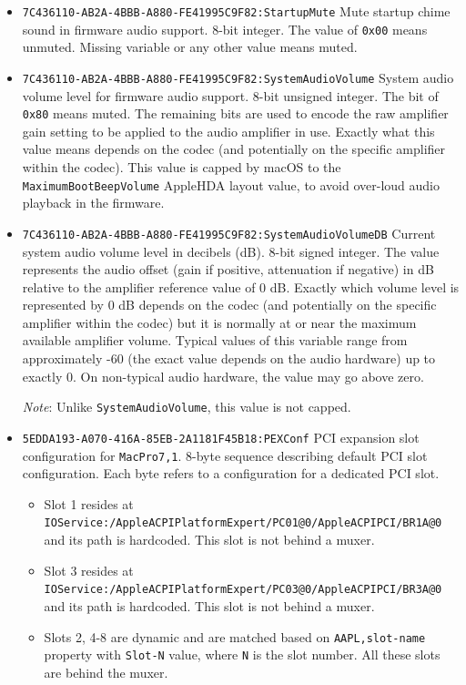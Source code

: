 \documentclass[]{article}
\providecommand{\tightlist}{%
  \setlength{\itemsep}{0pt}\setlength{\parskip}{0pt}}
\begin{document}
\begin{itemize}
  \texttt{7C436110-AB2A-4BBB-A880-FE41995C9F82:run-efi-updater}
  \break
  Override EFI firmware updating support in macOS (MultiUpdater, ThorUtil, and so on).
  Setting this to \texttt{No} or alternative boolean-castable value will prevent
  any firmware updates in macOS starting with 10.10 at least.
\item
  \texttt{7C436110-AB2A-4BBB-A880-FE41995C9F82:StartupMute}
  \break
  Mute startup chime sound in firmware audio support. 8-bit integer.
  The value of \texttt{0x00} means unmuted. Missing variable or any
  other value means muted.
\item
  \texttt{7C436110-AB2A-4BBB-A880-FE41995C9F82:SystemAudioVolume}
  \break
  System audio volume level for firmware audio support. 8-bit unsigned integer.
  The bit of \texttt{0x80} means muted. The remaining bits are used
  to encode the raw amplifier gain setting to be applied to the audio
  amplifier in use. Exactly what this value means depends on the codec
  (and potentially on the specific amplifier within the codec). This value
  is capped by macOS to the \texttt{MaximumBootBeepVolume} AppleHDA layout
  value, to avoid over-loud audio playback in the firmware.
\item
  \texttt{7C436110-AB2A-4BBB-A880-FE41995C9F82:SystemAudioVolumeDB}
  \break
  Current system audio volume level in decibels (dB).  8-bit signed integer.
  The value represents the audio offset (gain if positive,
  attenuation if negative) in dB relative to the amplifier reference value
  of 0 dB. Exactly which volume level is represented by 0 dB depends on the
  codec (and potentially on the specific amplifier within the codec)
  but it is normally at or near the maximum available amplifier volume.
  Typical values of this variable range from approximately -60 (the exact value
  depends on the audio hardware) up to exactly 0. On non-typical audio
  hardware, the value may go above zero.

  \emph{Note}: Unlike \texttt{SystemAudioVolume}, this value is not capped.
\item
  \texttt{5EDDA193-A070-416A-85EB-2A1181F45B18:PEXConf}
  \break
  PCI expansion slot configuration for \texttt{MacPro7,1}.
  8-byte sequence describing default PCI slot configuration.
  Each byte refers to a configuration for a dedicated PCI slot.

  \begin{itemize}
    \tightlist
    \item Slot 1 resides at \texttt{IOService:/AppleACPIPlatformExpert/PC01@0/AppleACPIPCI/BR1A@0}
      and its path is hardcoded. This slot is not behind a muxer.
    \item Slot 3 resides at \texttt{IOService:/AppleACPIPlatformExpert/PC03@0/AppleACPIPCI/BR3A@0}
      and its path is hardcoded. This slot is not behind a muxer.
    \item Slots 2, 4-8 are dynamic and are matched based on \texttt{AAPL,slot-name} property
      with \texttt{Slot-N} value, where \texttt{N} is the slot number. All these slots are
      behind the muxer.
  \end{itemize}


\end{itemize}
\end{document}
